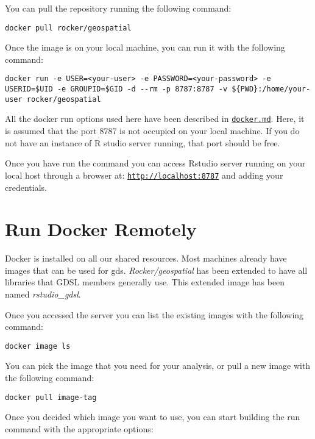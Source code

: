\documentclass[
]{book}
\begin{document}
You can pull the repository running the following command:

\begin{verbatim}
docker pull rocker/geospatial
\end{verbatim}

Once the image is on your local machine, you can run it with the following command:

\begin{verbatim}
docker run -e USER=<your-user> -e PASSWORD=<your-password> -e USERID=$UID -e GROUPID=$GID -d --rm -p 8787:8787 -v ${PWD}:/home/your-user rocker/geospatial
\end{verbatim}

All the docker run options used here have been described in \href{06_docker.md}{\texttt{docker.md}}. Here, it is assumed that the port 8787 is not occupied on your local machine. If you do not have an instance of R studio server running, that port should be free.

Once you have run the command you can access Rstudio server running on your local host through a browser at: \href{http://localhost:8787}{\texttt{http://localhost:8787}} and adding your credentials.

\hypertarget{run-docker-remotely}{%
\section{Run Docker Remotely}\label{run-docker-remotely}}

Docker is installed on all our shared resources. Most machines already have images that can be used for gds. \emph{Rocker/geospatial} has been extended to have all libraries that GDSL members generally use. This extended image has been named \emph{rstudio\_gdsl}.

Once you accessed the server you can list the existing images with the following command:

\begin{verbatim}
docker image ls
\end{verbatim}

You can pick the image that you need for your analysis, or pull a new image with the following command:

\begin{verbatim}
docker pull image-tag
\end{verbatim}

Once you decided which image you want to use, you can start building the run command with the appropriate options:
\end{document}
